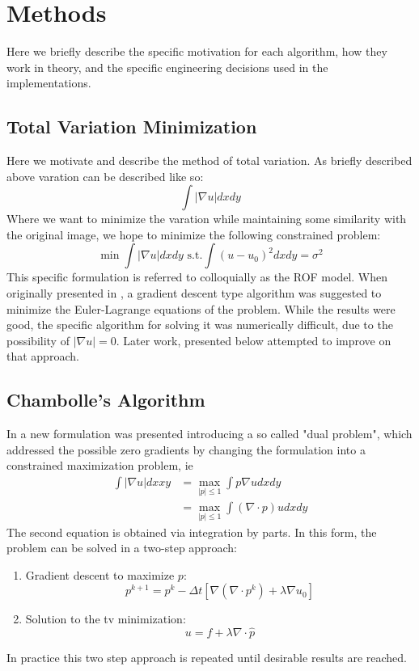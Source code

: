 \documentclass[11pt]{article}
\begin{document}
\section{Methods}
Here we briefly describe the specific motivation for each algorithm, how they work in theory, and the specific engineering decisions used in the implementations.
\subsection{Total Variation Minimization}
Here we motivate and describe the method of total variation.
As briefly described above varation can be described like so:
\begin{equation*}
\int |\nabla u| dx dy
\end{equation*}
Where we want to minimize the varation while maintaining some similarity with the original image, we hope to minimize the following constrained problem:
\begin{equation}
\min \int |\nabla u| dx dy \text{ s.t.} \int (u-u_0)^2 dxdy = \sigma^2
\label{tv:isotropic}
\end{equation}
This specific formulation is referred to colloquially as the ROF model.
When originally presented in \cite{rudin1992nonlinear}, a gradient descent type algorithm was suggested to minimize the Euler-Lagrange equations of the problem.
While the results were good, the specific algorithm for solving it was numerically difficult, due to the possibility of $|\nabla u|=0$.
Later work, presented below attempted to improve on that approach.

\subsection{Chambolle's Algorithm}
In \cite{chambolle2004algorithm} a new formulation was presented introducing a so called "dual problem", which addressed the possible zero gradients by changing the formulation into a constrained maximization problem, ie
\begin{align*}
\int |\nabla u| dx xy &= \max_{|p| \le 1} \int p \nabla u dx dy \\
&= \max_{|p| \le 1} \int (\nabla \cdot p) u dx dy
\end{align*}
The second equation is obtained via integration by parts.  
In this form, the problem can be solved in a two-step approach:
\begin{enumerate}
\item
Gradient descent to maximize $p$:
\begin{equation}
p^{k+1} = p^{k} - \Delta t \left[ \nabla( \nabla \cdot p^{k}) + \lambda \nabla u_0 \right]
\label{ch:dual}
\end{equation}
\item Solution to the tv minimization:
\begin{equation}
u = f + \lambda \nabla \cdot \hat{p}
\label{ch:primal}
\end{equation}
\end{enumerate}
In practice this two step approach is repeated until desirable results are reached.
\end{document}
